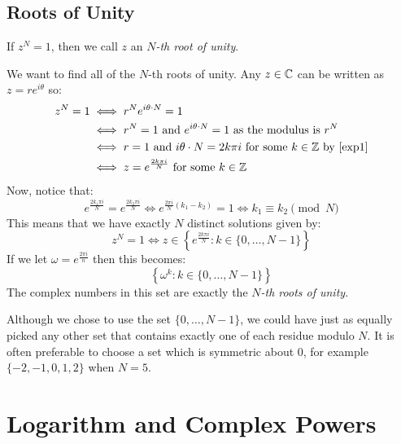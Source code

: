 \documentclass[../main.tex]{subfiles}
\begin{document}
\subsection{Roots of Unity}
\begin{definition}
  If $z^{N} = 1$, then we call $z$ an \textit{$N$-th root of unity}.
\end{definition}
We want to find all of the $N$-th roots of unity.
Any $z \in \mathbb{C}$ can be written as $z = re^{i\theta}$ so:
\begin{align*}
  z^N = 1 &\iff r^N e^{i\theta \cdot N} = 1 \\
          &\iff r^{N} = 1 \text{ and } e^{i \theta \cdot N} = 1 \text{ as the modulus is $r^{N}$} \\
          &\iff r = 1 \text{ and } i\theta \cdot N = 2k\pi i \text{ for some $k \in \Z$ by \cref{exp1}} \\
          &\iff z = e^{\frac{2k\pi i}{N}} \text{ for some $k \in \Z$}
\end{align*}
Now, notice that:
\[
  e^{\frac{2 k_1 \pi i}{N}} = e^{\frac{2 k_2 \pi i}{N}} \iff e^{\frac{2\pi i}{N}(k_1 - k_2)} = 1 \iff k_1 \equiv k_2 \pmod{N}
\]
This means that we have exactly $N$ distinct solutions given by:
\[
  z^{N} = 1 \iff z \in \left\{e^{\frac{2k \pi i}{N}}: k \in \{0, \ldots, N - 1\}\right\}
\]
If we let $\omega = e^{\frac{2 \pi i}{n}}$ then this becomes:
\[
  \left\{\omega^{k}: k \in \{0, \ldots, N - 1\}\right\}
\]
The complex numbers in this set are exactly the \textit{$N$-th roots of unity}.
\begin{remark}
  Although we chose to use the set $\{0, \ldots, N - 1\}$, we could have just as equally picked any other set that contains exactly one of each residue modulo $N$.
  It is often preferable to choose a set which is symmetric about 0, for example $\{-2, -1, 0, 1, 2\}$ when $N = 5$.
\end{remark}
\section{Logarithm and Complex Powers}
\end{document}
